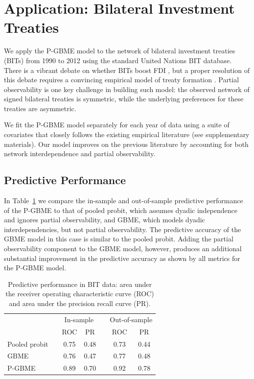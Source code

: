 \section{Application: Bilateral Investment Treaties}

We apply the P-GBME model to the network of bilateral investment treaties (BITs) from 1990 to 2012 using the standard United Nations BIT database. There is a vibrant debate on whether BITs boost FDI \citep{jandhyala:etal:2011, simmons:2014,minhas:2016}, but a proper resolution of this debate requires a convincing empirical model of treaty formation \citep{rosendorff:shin:2012}. Partial observability is one key challenge in building such model: the observed network of signed bilateral treaties is symmetric, while the underlying preferences for these treaties are  asymmetric. 

We fit the P-GBME model separately for each year of data using a suite of covariates that closely follows  the existing empirical literature (see supplementary materials). Our model improves on the previous literature by accounting for both network interdependence and partial observability. 

\subsection{Predictive Performance}

In Table~\ref{tab:perfAssess} we compare the in-sample and out-of-sample predictive performance of the P-GBME to that of pooled probit, which assumes dyadic independence and ignores partial observability, and GBME, which models dyadic interdependencies, but not partial observability. The predictive accuracy of the GBME model in this case is similar to the pooled probit. Adding the partial observability component to the GBME model, however, produces an additional substantial improvement in the predictive accuracy as shown by all metrics for the P-GBME model.

\begin{table}[h!]
\centering
\begin{tabular}{lcccccc}
\toprule
& & \multicolumn{2}{c}{In-sample} & & \multicolumn{2}{c}{Out-of-sample} \\
\cmidrule{3-4}\cmidrule{6-7}
& & ROC & PR & & ROC & PR\\
\midrule
Pooled probit& & 0.75 & 0.48 &  & 0.73 & 0.44\\
GBME && 0.76 & 0.47 & & 0.77 & 0.48 \\
P-GBME && 0.89 & 0.70 & & 0.92 & 0.78 \\
\bottomrule
\end{tabular}
\caption{Predictive performance in BIT data: area under the receiver operating characteristic curve (ROC) and area under the precision recall curve (PR).}
\label{tab:perfAssess}
\end{table} 

